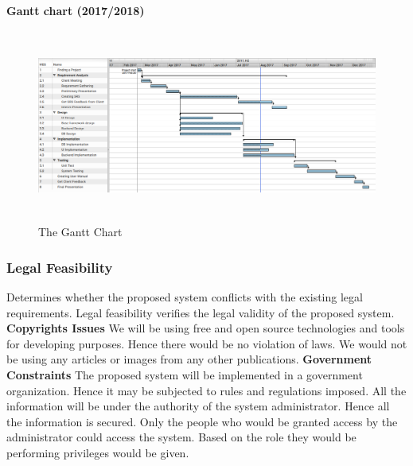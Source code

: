 \documentclass[a4paper,beamer]{article}
\begin{document}
	\vspace{1cm}
	\noindent\textbf{Gantt chart (2017/2018)}
	\begin{figure}[h]
		\begin{center}
			\includegraphics[width=6in,height=2.5in]{img/gantt}
		\end{center}
		\caption{The Gantt Chart}
		\label{fig:gantt}
	\end{figure}
	\newpage

	\subsubsection{Legal Feasibility}
	Determines whether the proposed system conflicts with the existing legal requirements. Legal feasibility verifies the legal validity of the proposed system.\newline
	\newline
	\textbf{Copyrights Issues}\newline
	We will be using free and open source technologies and tools for developing purposes. Hence there would be no violation of laws. We would not be using any articles or images from any other publications.\newline
	\newline
	\textbf{Government Constraints}\newline
	The proposed system will be implemented in a government organization. Hence it may be subjected to rules and regulations imposed.\newline
	All the information will be under the authority of the system administrator. Hence all the information is secured. Only the people who would be granted access by the administrator could access the system. Based on the role they would be performing privileges would be given.\newline
	
	\newpage
	
\end{document}
